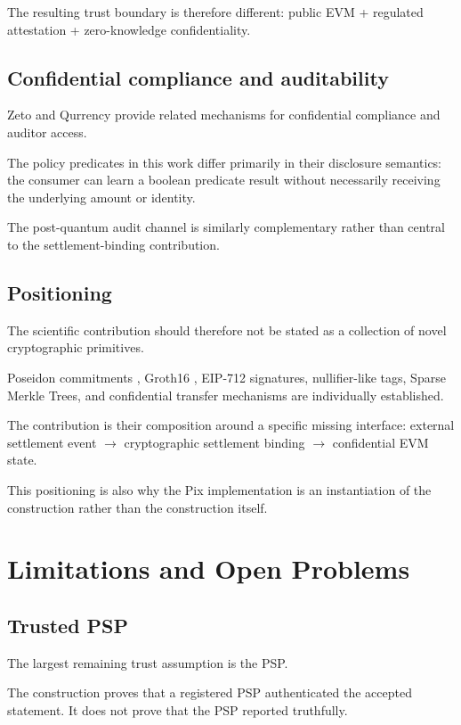 \documentclass[10pt,twocolumn]{article}
\begin{document}
The resulting trust boundary is therefore different: public EVM +
regulated attestation + zero-knowledge confidentiality.

\subsection{Confidential compliance and auditability}

Zeto \cite{zeto} and Qurrency \cite{qurrency} provide related mechanisms
for confidential compliance and auditor access.

The policy predicates in this work differ primarily in their disclosure
semantics: the consumer can learn a boolean predicate result without
necessarily receiving the underlying amount or identity.

The post-quantum audit channel is similarly complementary rather than
central to the settlement-binding contribution.

\subsection{Positioning}

The scientific contribution should therefore not be stated as a
collection of novel cryptographic primitives.

Poseidon commitments \cite{poseidon}, Groth16 \cite{groth16}, EIP-712
signatures, nullifier-like tags, Sparse Merkle Trees, and confidential
transfer mechanisms are individually established.

The contribution is their composition around a specific missing
interface: external settlement event $\rightarrow$ cryptographic
settlement binding $\rightarrow$ confidential EVM state.

This positioning is also why the Pix implementation is an instantiation
of the construction rather than the construction itself.

\section{Limitations and Open Problems}
\label{sec:limitations}

\subsection{Trusted PSP}

The largest remaining trust assumption is the PSP.

The construction proves that a registered PSP authenticated the accepted
statement. It does not prove that the PSP reported truthfully.
\end{document}

